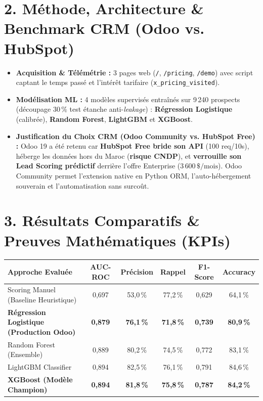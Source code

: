 \documentclass[10pt,a4paper]{article}
\begin{document}
\section{2. Méthode, Architecture \& Benchmark CRM (Odoo vs. HubSpot)}
\begin{itemize}
    \item \textbf{Acquisition \& Télémétrie :} 3 pages web (\texttt{/}, \texttt{/pricing}, \texttt{/demo}) avec script captant le temps passé et l'intérêt tarifaire (\texttt{x\_pricing\_visited}).
    \item \textbf{Modélisation ML :} 4 modèles supervisés entraînés sur 9\,240 prospects (découpage $30\,\%$ test étanche anti-\textit{leakage}) : \textbf{Régression Logistique} (calibrée), \textbf{Random Forest}, \textbf{LightGBM} et \textbf{XGBoost}.
    \item \textbf{Justification du Choix CRM (Odoo Community vs. HubSpot Free) :} Odoo 19 a été retenu car \textbf{HubSpot Free bride son API} (100 req/10s), héberge les données hors du Maroc (\textbf{risque CNDP}), et \textbf{verrouille son Lead Scoring prédictif} derrière l'offre Enterprise ($3\,600\,\$/\text{mois}$). Odoo Community permet l'extension native en Python ORM, l'auto-hébergement souverain et l'automatisation sans surcoût.
\end{itemize}

\vspace{-0.3em}

\section{3. Résultats Comparatifs \& Preuves Mathématiques (KPIs)}
\vspace{0.1em}
\noindent
\begin{tabularx}{\textwidth}{X c c c c c}
\toprule
\textbf{Approche Evaluée} & \textbf{AUC-ROC} & \textbf{Précision} & \textbf{Rappel} & \textbf{F1-Score} & \textbf{Accuracy} \\
\midrule
Scoring Manuel (Baseline Heuristique) & 0,697 & 53,0\,\% & 77,2\,\% & 0,629 & 64,1\,\% \\
\textbf{Régression Logistique (Production Odoo)} & \textbf{0,879} & \textbf{76,1\,\%} & \textbf{71,8\,\%} & \textbf{0,739} & \textbf{80,9\,\%} \\
Random Forest (Ensemble) & 0,889 & 80,2\,\% & 74,5\,\% & 0,772 & 83,1\,\% \\
LightGBM Classifier & 0,894 & 82,5\,\% & 76,1\,\% & 0,791 & 84,6\,\% \\
\textbf{XGBoost (Modèle Champion)} & \textbf{0,894} & \textbf{81,8\,\%} & \textbf{75,8\,\%} & \textbf{0,787} & \textbf{84,2\,\%} \\
\bottomrule
\end{tabularx}
\vspace{0.1em}
\end{document}
